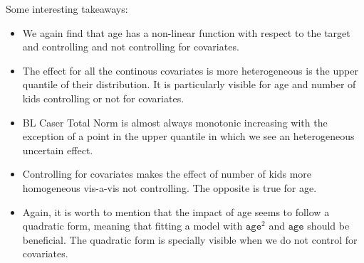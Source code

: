 \documentclass{article}
\begin{document}
Some interesting takeaways:

\begin{itemize}
  \item We again find that age has a non-linear function with respect to the target and controlling and not controlling for covariates.
  \item The effect for all the continous covariates is more heterogeneous is the upper quantile of their distribution. It is particularly visible for age and number of kids controlling or not for covariates.
  \item BL Caser Total Norm is almost always monotonic increasing with the exception of a point in the upper quantile in which we see an heterogeneous uncertain effect.
  \item Controlling for covariates makes the effect of number of kids more homogeneous vis-a-vis not controlling. The opposite is true for age.
  \item Again, it is worth to mention that the impact of age seems to follow a quadratic form, meaning that fitting a model with $\texttt{age}^2$ and $\texttt{age}$ should be beneficial. The quadratic form is specially visible when we do not control for covariates.
\end{itemize}
\end{document}
